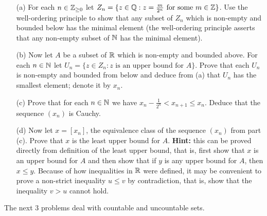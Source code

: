 \documentclass[11pt]{amsart}
\begin{document}
\begin{itemize}
\item[(a)] For each $n\in{\mathbb Z}_{\geq 0}$ let $Z_n=\{z\in{\mathbb Q}: z=\frac{m}{2^n}\mbox{ for some } m\in{\mathbb Z}\}$. Use the well-ordering principle to show that any
subset of $Z_n$ which is non-empty and bounded below has the minimal element (the well-ordering principle asserts that any non-empty subset of
${\mathbb N}$ has the minimal element).
\item[(b)] Now let $A$ be a subset of ${\mathbb R}$ which is non-empty and bounded above. For each $n\in{\mathbb N}$ let
$U_n=\{z\in Z_n: z\mbox{ is an upper bound for }A\}$. Prove that each $U_n$ is non-empty and bounded from below and deduce from (a)
that $U_n$ has the smallest element; denote it by $x_n$.
\item[(c)] Prove that for each $n\in{\mathbb N}$ we have $x_n-\frac{1}{2^n}<x_{n+1}\leq x_n$. Deduce that the sequence $(x_n)$ is Cauchy.
\item[(d)] Now let $x=[x_n]$, the equivalence class of the sequence $(x_n)$ from part (c). Prove that $x$ is the least upper bound for $A$.
{\bf Hint:} this can be proved directly from definition of the least upper bound, that is, first show that $x$ is an upper bound for $A$
and then show that if $y$ is any upper bound for $A$, then $x\leq y$. Because of how inequalities in ${\mathbb R}$ were defined, it may
be convenient to prove a non-strict inequality $u\leq v$ by contradiction, that is, show that the inequality $v>u$ cannot hold.
\end{itemize}
\skv
The next 3 problems deal with countable and uncountable sets.
\end{document}
